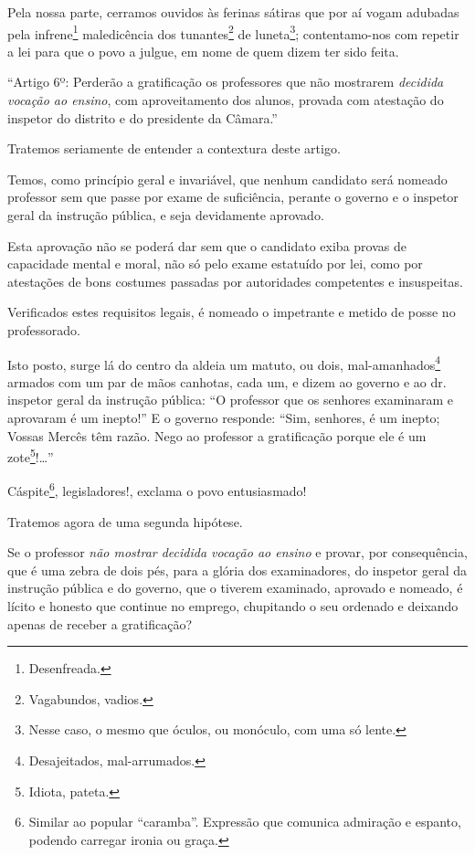 Pela nossa parte, cerramos ouvidos às ferinas sátiras que por aí vogam
adubadas pela infrene\footnote{Desenfreada.} maledicência dos
tunantes\footnote{Vagabundos, vadios.} de luneta\footnote{Nesse
  caso, o mesmo que óculos, ou monóculo, com uma só lente.};
contentamo-nos com repetir a lei para que o povo a julgue, em nome de
quem dizem ter sido feita.

``Artigo 6º: Perderão a gratificação os professores que não mostrarem
\emph{decidida vocação ao ensino}, com aproveitamento dos alunos,
provada com atestação do inspetor do distrito e do presidente da
Câmara.''

Tratemos seriamente de entender a contextura deste artigo.

Temos, como princípio geral e invariável, que nenhum candidato será
nomeado professor sem que passe por exame de suficiência, perante o
governo e o inspetor geral da instrução pública, e seja devidamente
aprovado.

Esta aprovação não se poderá dar sem que o candidato exiba provas de
capacidade mental e moral, não só pelo exame estatuído por lei, como por
atestações de bons costumes passadas por autoridades competentes e
insuspeitas.

Verificados estes requisitos legais, é nomeado o impetrante e metido de
posse no professorado.

Isto posto, surge lá do centro da aldeia um matuto, ou dois,
mal-amanhados\footnote{Desajeitados, mal-arrumados.} armados com um
par de mãos canhotas, cada um, e dizem ao governo e ao dr.\,inspetor
geral da instrução pública: ``O professor que os senhores examinaram e
aprovaram é um inepto!'' E o governo responde: ``Sim, senhores, é um
inepto; Vossas Mercês têm razão. Nego ao professor a gratificação porque
ele é um zote\footnote{Idiota, pateta.}!\ldots{}''

Cáspite\footnote{Similar ao popular ``caramba''. Expressão que comunica
  admiração e espanto, podendo carregar ironia ou graça.},
legisladores!, exclama o povo entusiasmado!

Tratemos agora de uma segunda hipótese.

Se o professor \emph{não mostrar decidida vocação ao ensino} e provar,
por consequência, que é uma zebra de dois pés, para a glória dos
examinadores, do inspetor geral da instrução pública e do governo, que o
tiverem examinado, aprovado e nomeado, é lícito e honesto que continue
no emprego, chupitando o seu ordenado e deixando apenas de receber a
gratificação?

